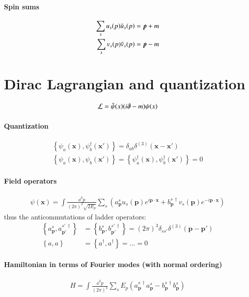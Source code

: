 \paragraph{Spin sums}
\begin{align}
	\sum_{s} u_s(p)\bar{u}_s(p) &= \slashed{p} + m  \\
	\sum_{s} v_s(p)\bar{v}_s(p) &= \slashed{p} - m 
\end{align}

\section{Dirac Lagrangian and quantization}
\begin{align}
	\mathcal{L} = \bar{\psi}(x) (i\slashed{\partial} - m) \psi(x)
\end{align}
\paragraph{Quantization}
\begin{align}
	\left\{ \psi_a(\pmb{x}), \psi_b^\dagger(\pmb{x}') \right\} = \delta_{ab}\delta^{(3)}(\pmb{x}-\pmb{x}') \\
	\left\{ \psi_a(\pmb{x}), \psi_b(\pmb{x}') \right\} = \left\{ \psi^\dagger_a(\pmb{x}), \psi^\dagger_b(\pmb{x}') \right\} = 0
\end{align}
\paragraph{Field operators}
\begin{align}
\psi(\pmb{x}) = \int \frac{\dd^3 p}{(2\pi)^3 \sqrt{2E_p}} \sum_s (a_{\pmb{p}}^s u_s(\pmb{p})e^{i\pmb{p}\cdot\pmb{x}} + b_{\pmb{p}}^{s\,\dagger} v_s(\pmb{p})e^{-i\pmb{p}\cdot\pmb{x}})
\end{align}
thus the anticommutations of ladder operators:
\begin{align*}
	\left\{ a_{\pmb{p}}^s, a_{\pmb{p'}}^{s'\,\dagger} \right\} &= \left\{ b_{\pmb{p}}^s, b_{\pmb{p'}}^{s'\,\dagger} \right\}= (2\pi)^3\delta_{ss'}\delta^{(3)}(\pmb{p}-\pmb{p}') \\
	\left\{ a, a \right\} &= \left\{ a^\dagger, a^\dagger \right\} = \dots = 0
\end{align*}
\paragraph{Hamiltonian in terms of Fourier modes (with normal ordering)}
\begin{align}
	H = \int \frac{\dd^3 p}{(2\pi)^3} \sum_s E_p (a_{\pmb{p}}^{s\,\dagger}a_{\pmb{p}}^{s}-b_{\pmb{p}}^{s\,\dagger}b_{\pmb{p}}^{s})
\end{align}

